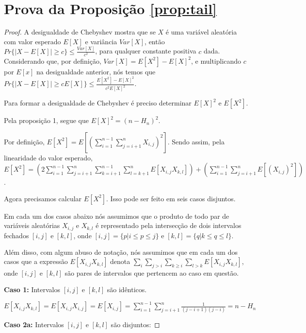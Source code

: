 \documentclass[dissertacao, brazil]{ThesisPUC}
\begin{document}
\section{Prova da Proposição \ref{prop:tail}}
\begin{proof}

\noindent A desigualdade de Chebyshev mostra que se  $X$ é uma variável aleatória com valor esperado $E[X]$ e variância $Var[X]$,
então $Pr\{ |X - E[X]| \geq c \} \leq \frac{Var[X]}{c^2}$, para qualquer constante positiva $c$ dada.
Considerando que, por definição,  $Var[X] = E[X^2] - E[X]^2$, e multiplicando $c$ por $E[x]$ na desigualdade anterior, nós temos que 
$Pr\{ |X - E[X]| \geq c E[X] \} \leq \frac{E[X^2] - E[X]^2}{c^2 E[X]^2}$.

Para formar a desigualdade de Chebyshev é preciso determinar $E[X]^2$ e $E[X^2]$.

Pela proposição 1, segue que $E[X]^2 = (n - H_{n})^2$.

Por definição, $E[X^2] = E [( \sum\limits_{i=1}^{n-1} \sum\limits_{j=i+1}^{n} X_{i,j})^2]$.
Sendo assim, pela linearidade do valor esperado, $E[X^2] = ( 2 \sum\limits_{i=1}^{n-1} \sum\limits_{j=i+1}^{n}
\sum\limits_{k=i+1}^{n-1} \sum\limits_{l=k+1}^{n} E[X_{i,j} X_{k,l}] ) +
( \sum\limits_{i=1}^{n-1} \sum\limits_{j=i+1}^{n} E[(X_{i,j})^2] )$.

Agora precisamos calcular $E[X^2]$. Isso pode ser feito em seis casos disjuntos.

Em cada um dos casos abaixo nós assumimos que o produto de todo par de variáveis
aleatórias $X_{i, j}$ e $X_{k,l}$ é representado pela intersecção de dois
intervalos fechados $[i,j]$ e $[k,l]$, onde $[i,j] = \{p | i \leq p \leq j \}$
e $[k,l] = \{q | k \leq q \leq l \}$.

Além disso, com algum abuso de notação, nós assumimos que em cada um dos casos que a expressão
 $E[X_{i,j} X_{k,l}]$ denota $\sum\limits_{i}\sum\limits_{j >i}\sum\limits_{k \geq i}\sum\limits_{l > k} E[X_{i,j} X_{k,l}]$, 
 onde $[i,j]$ e $[k,l]$ são pares de intervalos que pertencem ao caso em questão.

{\bf Caso 1:} Intervalos $[i, j]$ e $[k, l]$ são idênticos.

$E[X_{i,j} X_{k,l}] = E[X_{i,j} X_{i,j}] = E[X_{i,j}] = \sum\limits_{i=1}^{n-1} \sum\limits_{j=i+1}^{n}
\frac{1}{(j-i+1)(j-i)} = n - H_n$

\vspace{0.5cm}


{\bf Caso 2a:} Intervalos $[i, j]$ e $[k, l]$ são disjuntos:


\end{proof}
\end{document}
